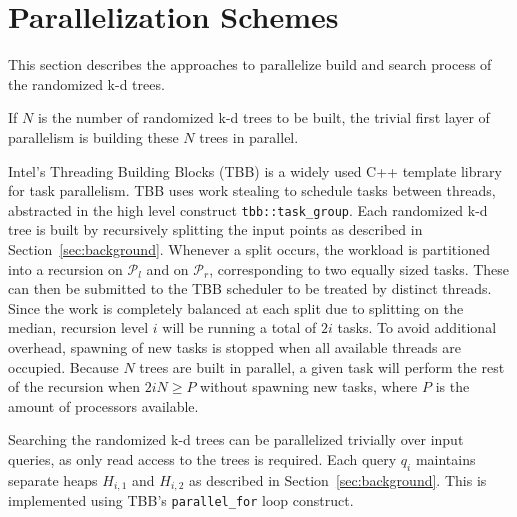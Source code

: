 \section{Parallelization Schemes}
  \label{sec:method}

This section describes the approaches to parallelize build and search process
 of the randomized k-d trees. 

If $N$ is the number of randomized k-d trees to be built, the trivial first
 layer of parallelism is building these $N$ trees in parallel.

Intel's Threading Building Blocks (TBB) %
is a widely used C++ template library for
task parallelism. TBB uses work stealing to schedule tasks between threads, abstracted in the high level construct \texttt{tbb::task\_group}. Each randomized k-d tree is built by recursively splitting the input points as described in Section~\ref{sec:background}.
Whenever a split occurs, the workload is partitioned into a recursion on $\mathcal{P}_l$ and on $\mathcal{P}_r$, corresponding to two equally sized tasks. These can then be submitted to the TBB scheduler to be treated by distinct threads. Since the work is completely balanced at each split due to splitting on the median, recursion level $i$ will be running a total of $2i$ tasks. To avoid additional overhead, spawning of new tasks is stopped when all available threads are occupied. Because
$N$ trees are built in parallel, a given task will perform the rest of the recursion when $2 i N\geq P$ without spawning new tasks, where $P$ is the amount of processors available.

   Searching the randomized k-d trees can be parallelized trivially over input queries, as only read access to the trees is required. Each query $q_i$ maintains separate heaps $H_{i,1}$ and $H_{i,2}$ as described in Section~\ref{sec:background}. This is implemented using TBB's \texttt{parallel\_for} loop construct. 

